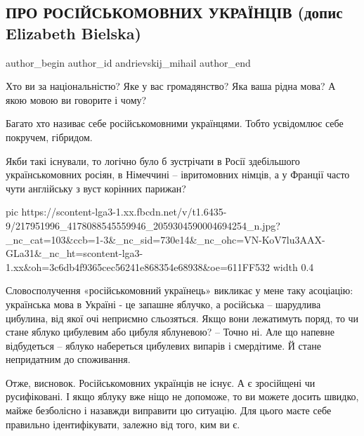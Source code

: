  
 
 
 
 
 
\subsection{ПРО РОСІЙСЬКОМОВНИХ УКРАЇНЦІВ (допис Elizabeth Bielska)}
\label{sec:21_07_2021.fb.andrievskij_mihail.1.rus_ukraincy}
 
\ifcmt
 author_begin
   author_id andrievskij_mihail
 author_end
\fi

Хто ви за національністю? Яке у вас громадянство? Яка ваша рідна мова? А якою
мовою ви говорите і чому?

Багато хто називає себе російськомовними українцями. Тобто усвідомлює себе
покручем, гібридом. 

Якби такі існували, то логічно було б зустрічати в Росії здебільшого
українськомовних росіян, в Німеччині – івритомовних німців, а у Франції часто
чути англійську з вуст корінних парижан?

\ifcmt
  pic https://scontent-lga3-1.xx.fbcdn.net/v/t1.6435-9/217951996_4178088545559946_2059304590004694254_n.jpg?_nc_cat=103&ccb=1-3&_nc_sid=730e14&_nc_ohc=VN-KoV7lu3AAX-GLa31&_nc_ht=scontent-lga3-1.xx&oh=3c6db4f9365cec56241e868354e68938&oe=611FF532
  width 0.4
\fi

Словосполучення «російськомовний українець» викликає у мене таку асоціацію:
українська мова в Україні - це запашне яблучко, а російська – шарудлива
цибулина, від якої очі неприємно сльозяться. Якщо вони лежатимуть поряд, то чи
стане яблуко цибулевим або цибуля яблуневою? – Точно ні. Але що напевне
відбудеться – яблуко набереться цибулевих випарів і смердітиме. Й стане
непридатним до споживання.

Отже, висновок. Російськомовних українців не існує. А є зросійщені чи
русифіковані. І якщо яблуку вже ніщо не допоможе, то ви можете досить швидко,
майже безболісно і назавжди виправити цю ситуацію. Для цього маєте себе
правильно ідентифікувати, залежно від того, ким ви є.

